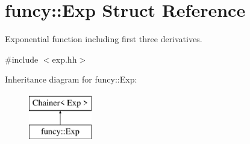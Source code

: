\hypertarget{structfuncy_1_1Exp}{\section{funcy\-:\-:Exp Struct Reference}
\label{structfuncy_1_1Exp}
}


Exponential function including first three derivatives.  




{\ttfamily \#include $<$exp.\-hh$>$}

Inheritance diagram for funcy\-:\-:Exp\-:\begin{figure}[H]
\begin{center}
\leavevmode
\includegraphics[height=2.000000cm]{structfuncy_1_1Exp}
\end{center}
\end{figure}
